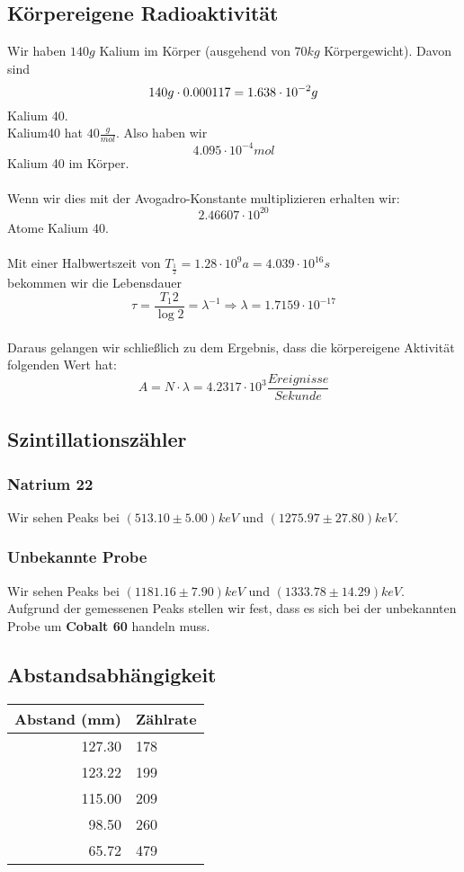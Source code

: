 \documentclass{article}
\begin{document}
\subsection{Körpereigene Radioaktivität}
Wir haben $140g$ Kalium im Körper (ausgehend von $70kg$ Körpergewicht).
Davon sind
$$
140g\cdot 0.000117=1.638\cdot10^{-2}g \\
$$
Kalium 40.\\
Kalium40 hat $40\frac{g}{mol}$. Also haben wir \\
$$4.095\cdot10^{-4}mol$$ Kalium 40 im Körper.\\
\\
Wenn wir dies mit der Avogadro-Konstante multiplizieren erhalten wir:\\
$$2.46607\cdot 10^{20}$$ Atome Kalium 40.\\
\\
Mit einer Halbwertszeit von $T_{\frac{1}{2}}= 1.28 \cdot 10^{9}a=4.039\cdot 10^{16}s$ \\
bekommen wir die Lebensdauer $$\tau=\frac{T_{1}{2}}{\log{2}}=\lambda^{-1} \Rightarrow \lambda=1.7159 \cdot 10^{-17}$$
\\
Daraus gelangen wir schließlich zu dem Ergebnis, dass die körpereigene Aktivität folgenden Wert hat:
$$A=N\cdot \lambda = 4.2317\cdot 10^{3} \frac{Ereignisse}{Sekunde}$$
\subsection{Szintillationszähler}
\subsubsection{Natrium 22}
Wir sehen Peaks bei $(513.10 \pm 5.00)keV$ und $(1275.97 \pm 27.80)keV$.


\subsubsection{Unbekannte Probe}
Wir sehen Peaks bei $(1181.16 \pm 7.90)keV$ und $(1333.78 \pm 14.29)keV$.\\
Aufgrund der gemessenen Peaks stellen wir fest, dass es sich bei der unbekannten Probe um \textbf{Cobalt 60} handeln muss.


\subsection{Abstandsabhängigkeit}
\begin{tabular}{|r|l|}
\hline
Abstand (mm) & Zählrate\\
\hline
127.30 & 178\\
123.22 & 199\\
115.00 & 209\\
98.50 & 260\\
65.72 & 479\\
\hline
\end{tabular}
\end{document}
